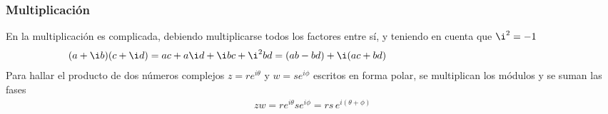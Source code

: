 \documentclass[letterpaper,10pt,english]{jupyterBook}
\begin{document}
\subsubsection{Multiplicación}
\label{\detokenize{docs/Part_01_Formalismo/Chapter_01_02_Formalismo_matem_xe1tico/01_01_Numeros_Complejos_myst:multiplicacion}}
\sphinxAtStartPar
En  la multiplicación es complicada, debiendo multiplicarse todos los factores entre sí, y
teniendo en cuenta que \(\i^2= -1\)
\begin{equation*}
\begin{split}
(a + \i b) (c + \i d) =ac +  a\i d +\i bc +\i^2 bd = (ab - bd) + \i(ac + bd)\hspace{6cm}
\end{split}
\end{equation*}
\sphinxAtStartPar
Para hallar el producto de dos números complejos \(z=r e^{i\theta}\) y \(w=s e^{i\phi}\) escritos en forma polar, se multiplican los módulos y se suman las fases
\begin{equation*}
\begin{split}
z w = r e^{i\theta} s e^{i\phi} = rs\,   e^{i(\theta + \phi)} 
\end{split}
\end{equation*}
\end{document}
